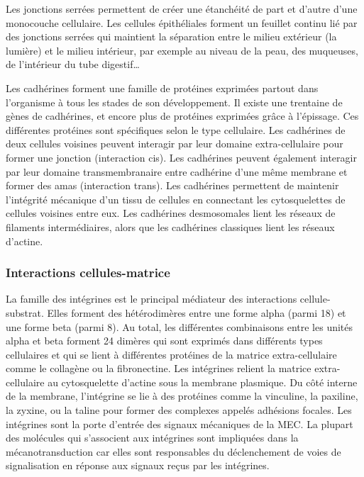 \documentclass{report}
\begin{document}
Les jonctions serrées permettent de créer une étanchéité de part et d'autre d'une monocouche cellulaire. Les cellules épithéliales forment un feuillet continu lié par des jonctions serrées qui maintient la séparation entre le milieu extérieur (la lumière) et le milieu intérieur, par exemple au niveau de la peau, des muqueuses, de l'intérieur du tube digestif\dots

Les cadhérines forment une famille de protéines exprimées partout dans l'organisme à tous les stades de son développement. 
Il existe une trentaine de gènes de cadhérines, et encore plus de protéines exprimées grâce à l'épissage. Ces différentes protéines sont spécifiques selon le type cellulaire.
Les cadhérines de deux cellules voisines peuvent interagir par leur domaine extra-cellulaire pour former une jonction (interaction cis). Les cadhérines peuvent également interagir par leur domaine transmembranaire entre cadhérine d'une même membrane et former des amas (interaction trans). 
Les cadhérines permettent de maintenir l'intégrité mécanique d'un tissu de cellules en connectant les cytosquelettes de cellules voisines entre eux. Les cadhérines desmosomales lient les réseaux de filaments intermédiaires, alors que les cadhérines classiques lient les réseaux d'actine. 


\subsubsection{Interactions cellules-matrice}

La famille des intégrines est le principal médiateur des interactions cellule-substrat. Elles forment des hétérodimères entre une forme alpha (parmi 18) et une forme beta (parmi 8). Au total, les différentes combinaisons entre les unités alpha et beta forment 24 dimères qui sont exprimés dans différents types cellulaires et qui se lient à différentes protéines de la matrice extra-cellulaire comme le collagène ou la fibronectine. 
Les intégrines relient la matrice extra-cellulaire au cytosquelette d'actine sous la membrane plasmique. Du côté interne de la membrane, l'intégrine se lie à des protéines comme la vinculine, la paxiline, la zyxine, ou la taline pour former des complexes appelés adhésions focales. 
Les intégrines sont la porte d'entrée des signaux mécaniques de la MEC. La plupart des molécules qui s'associent aux intégrines sont impliquées dans la mécanotransduction car elles sont responsables du déclenchement de voies de signalisation en réponse aux signaux reçus par les intégrines. 
\end{document}
